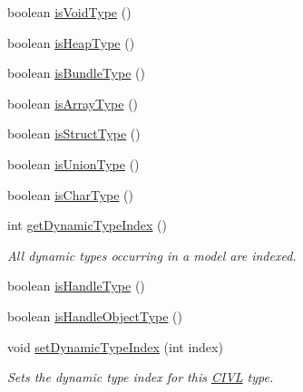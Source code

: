 \begin{DoxyCompactItemize}
boolean \hyperlink{classedu_1_1udel_1_1cis_1_1vsl_1_1civl_1_1model_1_1common_1_1type_1_1CommonType_af498d6c5239a86a9261a95ad51476a8a}{is\+Void\+Type} ()
\item 
boolean \hyperlink{classedu_1_1udel_1_1cis_1_1vsl_1_1civl_1_1model_1_1common_1_1type_1_1CommonType_a68e14752603ed0af3cfae35ebb75a849}{is\+Heap\+Type} ()
\item 
boolean \hyperlink{classedu_1_1udel_1_1cis_1_1vsl_1_1civl_1_1model_1_1common_1_1type_1_1CommonType_a483c484757c59cc4e3c5bc84e9300062}{is\+Bundle\+Type} ()
\item 
boolean \hyperlink{classedu_1_1udel_1_1cis_1_1vsl_1_1civl_1_1model_1_1common_1_1type_1_1CommonType_aa74c203a049dbe1363bf7d8578d36e04}{is\+Array\+Type} ()
\item 
boolean \hyperlink{classedu_1_1udel_1_1cis_1_1vsl_1_1civl_1_1model_1_1common_1_1type_1_1CommonType_a0bcddfcee8bb8b4365778d82f1ce1d73}{is\+Struct\+Type} ()
\item 
boolean \hyperlink{classedu_1_1udel_1_1cis_1_1vsl_1_1civl_1_1model_1_1common_1_1type_1_1CommonType_a93989974d5c6d7aa27621835adfc7e8e}{is\+Union\+Type} ()
\item 
boolean \hyperlink{classedu_1_1udel_1_1cis_1_1vsl_1_1civl_1_1model_1_1common_1_1type_1_1CommonType_afe741550bc94d7fa39f3019cfb050d96}{is\+Char\+Type} ()
\item 
int \hyperlink{classedu_1_1udel_1_1cis_1_1vsl_1_1civl_1_1model_1_1common_1_1type_1_1CommonType_a621ae6102dc7d6cec6c630bcd6441f7d}{get\+Dynamic\+Type\+Index} ()
\begin{DoxyCompactList}\small\item\em All dynamic types occurring in a model are indexed. \end{DoxyCompactList}\item 
boolean \hyperlink{classedu_1_1udel_1_1cis_1_1vsl_1_1civl_1_1model_1_1common_1_1type_1_1CommonType_a21f8fc743f76283fb4dce5b9c5b36ee3}{is\+Handle\+Type} ()
\item 
boolean \hyperlink{classedu_1_1udel_1_1cis_1_1vsl_1_1civl_1_1model_1_1common_1_1type_1_1CommonType_a53e1f58bf22ca6950d0b251f6c229d9a}{is\+Handle\+Object\+Type} ()
\item 
void \hyperlink{classedu_1_1udel_1_1cis_1_1vsl_1_1civl_1_1model_1_1common_1_1type_1_1CommonType_a97c4db7707edf782ea7dc2252c8b217a}{set\+Dynamic\+Type\+Index} (int index)
\begin{DoxyCompactList}\small\item\em Sets the dynamic type index for this \hyperlink{classedu_1_1udel_1_1cis_1_1vsl_1_1civl_1_1CIVL}{C\+I\+V\+L} type. \end{DoxyCompactList}\item 

\end{DoxyCompactItemize}
